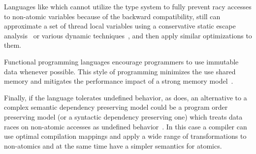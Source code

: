 Languages like \Java which cannot utilize the type system 
to fully prevent racy accesses to non-atomic variables 
because of the backward compatibility, still can 
approximate a set of thread local variables    
using a conservative static escape analysis~\cite{Choi-al:OOPSLA1999}
or various dynamic techniques~\cite{Liu-al:PLDI19},
and then apply similar optimizations to them. 

Functional programming languages encourage 
programmers to use immutable data whenever possible.
This style of programming minimizes the use 
shared memory and mitigates the performance impact 
of a strong memory model~\cite{Vollmer-al:PPoPP17}. 

Finally, if the language tolerates undefined behavior, as \CPP does, 
an alternative to a complex semantic dependency preserving model
could be a program order preserving model (or a syntactic dependency preserving one) 
which treats data races on non-atomic accesses as 
undefined behavior~\cite{Boehm-Demsky:MSPC14, Ou-Demsky:OOPSLA18}.
In this case a compiler can use optimal compilation mappings 
and apply a wide range of transformations to non-atomics 
and at the same time have a simpler semantics for atomics. 
